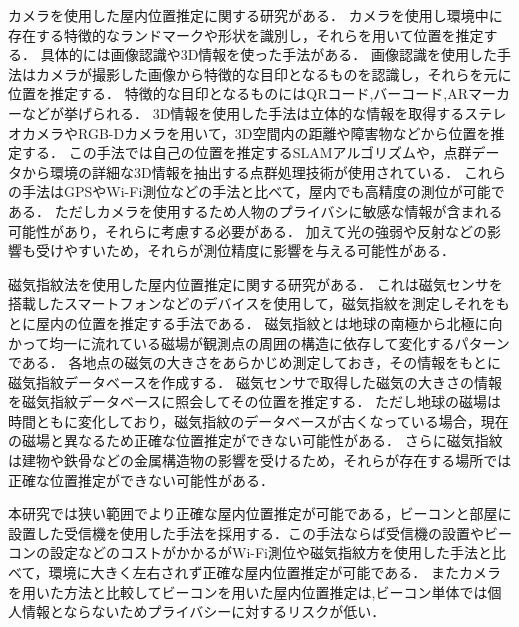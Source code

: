 カメラを使用した屋内位置推定に関する研究がある\cite{camera0}\cite{camera1}．
カメラを使用し環境中に存在する特徴的なランドマークや形状を識別し，それらを用いて位置を推定する．
具体的には画像認識や3D情報を使った手法がある．
画像認識を使用した手法はカメラが撮影した画像から特徴的な目印となるものを認識し，それらを元に位置を推定する．
特徴的な目印となるものにはQRコード,バーコード,ARマーカーなどが挙げられる．
3D情報を使用した手法は立体的な情報を取得するステレオカメラやRGB-Dカメラを用いて，3D空間内の距離や障害物などから位置を推定する．
この手法では自己の位置を推定するSLAMアルゴリズムや，点群データから環境の詳細な3D情報を抽出する点群処理技術が使用されている．
これらの手法はGPSやWi-Fi測位などの手法と比べて，屋内でも高精度の測位が可能である．
ただしカメラを使用するため人物のプライバシに敏感な情報が含まれる可能性があり，それらに考慮する必要がある．
加えて光の強弱や反射などの影響も受けやすいため，それらが測位精度に影響を与える可能性がある．



磁気指紋法を使用した屋内位置推定に関する研究がある\cite{magnetic0}\cite{magnetic1}．
これは磁気センサを搭載したスマートフォンなどのデバイスを使用して，磁気指紋を測定しそれをもとに屋内の位置を推定する手法である．
磁気指紋とは地球の南極から北極に向かって均一に流れている磁場が観測点の周囲の構造に依存して変化するパターンである．
各地点の磁気の大きさをあらかじめ測定しておき，その情報をもとに磁気指紋データベースを作成する．
磁気センサで取得した磁気の大きさの情報を磁気指紋データベースに照会してその位置を推定する．
ただし地球の磁場は時間ともに変化しており，磁気指紋のデータベースが古くなっている場合，現在の磁場と異なるため正確な位置推定ができない可能性がある．
さらに磁気指紋は建物や鉄骨などの金属構造物の影響を受けるため，それらが存在する場所では正確な位置推定ができない可能性がある．


本研究では狭い範囲でより正確な屋内位置推定が可能である，ビーコンと部屋に設置した受信機を使用した手法を採用する．この手法ならば受信機の設置やビーコンの設定などのコストがかかるがWi-Fi測位や磁気指紋方を使用した手法と比べて，環境に大きく左右されず正確な屋内位置推定が可能である．
またカメラを用いた方法と比較してビーコンを用いた屋内位置推定は,ビーコン単体では個人情報とならないためプライバシーに対するリスクが低い．

















